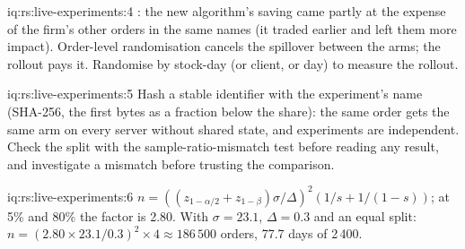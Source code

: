 \begin{solution}{iq:rs:live-experiments:4}
: the new algorithm's saving came partly at the expense of the firm's other orders in the same names (it traded earlier and left them more impact).
Order-level randomisation cancels the spillover between the arms; the rollout pays it. Randomise by stock-day (or client, or day) to measure the rollout.
\end{solution}

\begin{solution}{iq:rs:live-experiments:5}
Hash a stable identifier with the experiment's name (SHA-256, the first bytes as a fraction below the share): the same order gets the same arm on every server
without shared state, and experiments are independent. Check the split with the sample-ratio-mismatch test before reading any result, and investigate a
mismatch before trusting the comparison.
\end{solution}

\begin{solution}{iq:rs:live-experiments:6}
$n = ((z_{1-\alpha/2} + z_{1-\beta})\sigma/\Delta)^2 (1/s + 1/(1-s))$; at 5\% and 80\% the factor is 2.80. With $\sigma = 23.1$, $\Delta = 0.3$ and an equal
split: $n = (2.80 \times 23.1/0.3)^2 \times 4 \approx 186\,500$ orders, 77.7 days of 2\,400.
\end{solution}

